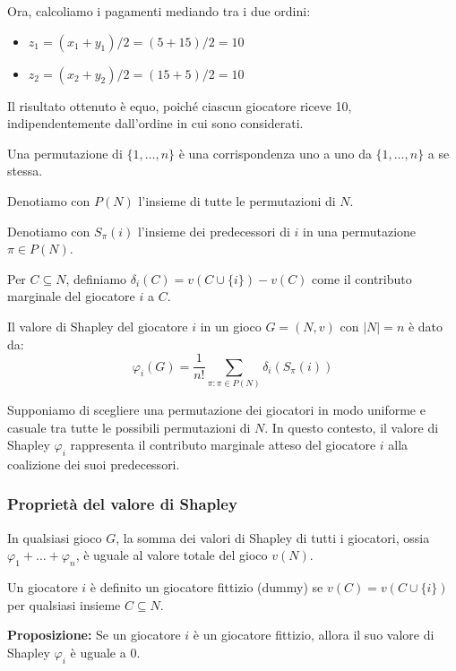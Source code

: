 Ora, calcoliamo i pagamenti mediando tra i due ordini:
\begin{itemize}
    \item $z_1 = (x_1 + y_1) / 2 = (5 + 15) / 2 = 10$
    \item $z_2 = (x_2 + y_2) / 2 = (15 + 5) / 2 = 10$
\end{itemize}

Il risultato ottenuto è equo, poiché ciascun giocatore riceve 10,
indipendentemente dall'ordine in cui sono considerati.

Una permutazione di $\{1, \ldots, n\}$ è una corrispondenza uno a uno da $\{1,
    \ldots, n\}$ a se stessa.

Denotiamo con $P(N)$ l'insieme di tutte le permutazioni di $N$.

Denotiamo con $S_{\pi}(i)$ l'insieme dei predecessori di $i$ in una
permutazione $\pi \in P(N)$.

Per $C \subseteq N$, definiamo $\delta_i(C) = v(C \cup \{i\}) - v(C)$ come il
contributo marginale del giocatore $i$ a $C$.

Il valore di Shapley del giocatore $i$ in un gioco $G = (N, v)$ con $|N| = n$ è
dato da:
\[
    \varphi_i(G) = \frac{1}{n!} \sum_{\pi: \pi \in P(N)} \delta_i(S_{\pi}(i))
\]

Supponiamo di scegliere una permutazione dei giocatori in modo uniforme e
casuale tra tutte le possibili permutazioni di $N$. In questo contesto, il
valore di Shapley $\varphi_i$ rappresenta il contributo marginale atteso del
giocatore $i$ alla coalizione dei suoi predecessori.

\subsubsection{Proprietà del valore di Shapley}
\begin{definition}[Proprietà 1]

    In qualsiasi gioco $G$, la somma dei valori di Shapley di tutti i giocatori,
    ossia $\varphi_1 + \ldots + \varphi_n$, è uguale al valore totale del gioco
    $v(N)$.

\end{definition}

\begin{definition}[Proprietà 2]

    Un giocatore $i$ è definito un giocatore fittizio (dummy) se $v(C) = v(C \cup
        \{i\})$ per qualsiasi insieme $C \subseteq N$.

    \textbf{Proposizione:} Se un giocatore $i$ è un giocatore fittizio, allora il suo valore di Shapley $\varphi_i$ è uguale a 0.

\end{definition}

